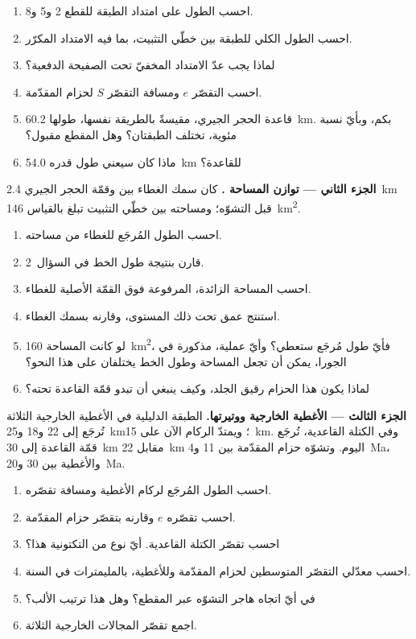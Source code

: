 \begin{problem}
\begin{enumerate}
\item احسب الطول على امتداد الطبقة للقطع 2 و5 و8.
\item احسب الطول الكلي للطبقة بين خطّي التثبيت، بما فيه الامتداد
المكرّر.
\item لماذا يجب عدّ الامتداد المخفيّ تحت الصفيحة الدفعية؟
\item احسب التقصّر $e$ ومسافة التقصّر $S$ لحزام المقدّمة.
\item قاعدة الحجر الجيري، مقيسةً بالطريقة نفسها، طولها \qty{60.2}{km}. بكم،
وبأيّ نسبة مئوية، تختلف الطبقتان؟ وهل المقطع مقبول؟
\item ماذا كان سيعني طول قدره \qty{54.0}{km} للقاعدة؟
\end{enumerate}

\noindent\textbf{الجزء الثاني --- توازن المساحة .} كان سمك الغطاء بين
 وقمّة الحجر الجيري \qty{2.4}{km} قبل التشوّه؛
ومساحته بين خطّي التثبيت تبلغ بالقياس \qty{146}{km^2}.
\begin{enumerate}[resume]
\item احسب الطول المُرجَع للغطاء من مساحته.
\item قارن بنتيجة طول الخط في السؤال~2.
\item احسب المساحة الزائدة، المرفوعة فوق القمّة الأصلية للغطاء.
\item استنتج عمق  تحت ذلك المستوى، وقارنه بسمك
الغطاء.
\item لو كانت المساحة \qty{160}{km^2}، فأيّ طول مُرجَع ستعطي؟ وأيّ عملية،
مذكورة في الجورا، يمكن أن تجعل المساحة وطول الخط يختلفان على هذا النحو؟
\item لماذا يكون هذا الحزام رقيق الجلد، وكيف ينبغي أن تبدو قمّة القاعدة
تحته؟
\end{enumerate}

\noindent\textbf{الجزء الثالث --- الأغطية الخارجية ووتيرتها.} الطبقة الدليلية في
الأغطية الخارجية الثلاثة تُرجَع إلى 22 و18 و\qty{25}{km}؛ ويمتدّ الركام الآن على
\qty{15}{km}. وفي الكتلة القاعدية، تُرجَع قمّة القاعدة إلى \qty{30}{km}
مقابل \qty{22}{km} اليوم. وتشوّه حزام المقدّمة بين 11 و\qty{4}{Ma}،
والأغطية بين 30 و\qty{20}{Ma}.
\begin{enumerate}[resume]
\item احسب الطول المُرجَع لركام الأغطية ومسافة تقصّره.
\item احسب تقصّره $e$ وقارنه بتقصّر حزام المقدّمة.
\item احسب تقصّر الكتلة القاعدية. أيّ نوع من التكتونية هذا؟
\item احسب معدّلي التقصّر المتوسطين لحزام المقدّمة وللأغطية، بالمليمترات
في السنة.
\item في أيّ اتجاه هاجر التشوّه عبر المقطع؟ وهل هذا ترتيب
الألب؟
\item اجمع تقصّر المجالات الخارجية الثلاثة.
\end{enumerate}


\end{problem}
